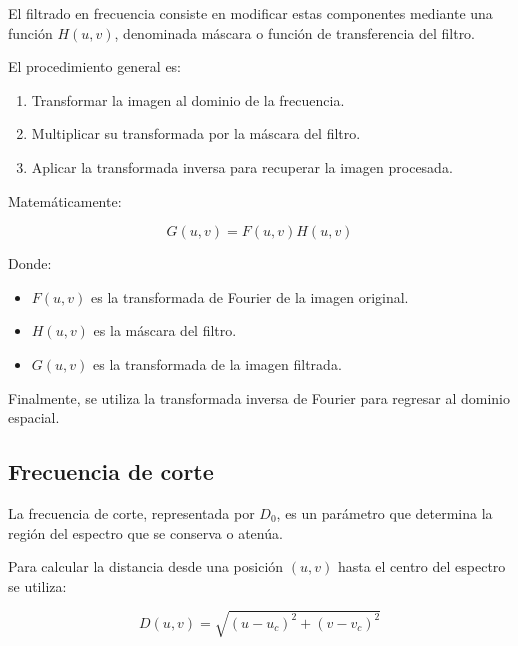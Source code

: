 \documentclass[11pt,letterpaper]{article}
\begin{document}
El filtrado en frecuencia consiste en modificar
estas componentes mediante una función
$H(u,v)$, denominada máscara o función
de transferencia del filtro.

El procedimiento general es:

\begin{enumerate}

    \item Transformar la imagen al dominio
    de la frecuencia.

    \item Multiplicar su transformada por
    la máscara del filtro.

    \item Aplicar la transformada inversa
    para recuperar la imagen procesada.

\end{enumerate}

Matemáticamente:

\begin{equation}
G(u,v)=F(u,v)H(u,v)
\label{eq:filtrado}
\end{equation}

Donde:

\begin{itemize}

    \item $F(u,v)$ es la transformada de Fourier
    de la imagen original.

    \item $H(u,v)$ es la máscara del filtro.

    \item $G(u,v)$ es la transformada
    de la imagen filtrada.

\end{itemize}

Finalmente, se utiliza la transformada inversa
de Fourier para regresar al dominio espacial.

\subsection{Frecuencia de corte}

La frecuencia de corte, representada por $D_0$,
es un parámetro que determina la región del
espectro que se conserva o atenúa.

Para calcular la distancia desde una posición
$(u,v)$ hasta el centro del espectro se utiliza:

\begin{equation}
D(u,v)=
\sqrt{
(u-u_c)^2+(v-v_c)^2
}
\end{equation}
\end{document}
